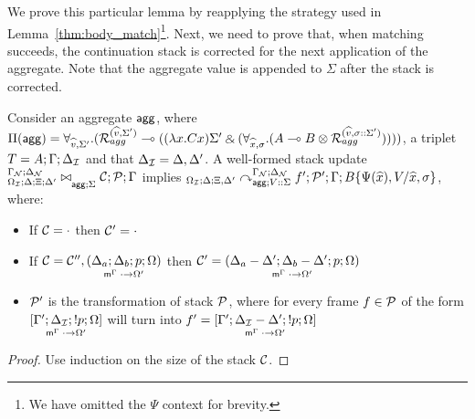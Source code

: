 We prove this particular lemma by reapplying the strategy used in
Lemma~\ref{thm:body_match}\footnote{We have omitted the $\Psi$ context for
brevity.}. Next, we need to prove that, when matching succeeds, the
continuation stack is corrected for the next application of the aggregate.  Note
that the aggregate value is appended to $\Sigma$ after the stack is corrected.

\begin{theorem}\label{thm:agg_from_update_to_derivation}
Consider an aggregate $\m{agg}$, where $\Pi(\m{agg}) = \forall_{\widehat{v}, \Sigma'}.
   (\defstwo{agg}{\widehat{v}}{\Sigma'} \lolli ((\lambda x. C x)\Sigma' \with (\forall_{\widehat{x}, \sigma}.
                                                (A \lolli B \otimes
                                                 \defstwo{agg}{\widehat{v}}{\sigma
                                                 ::\Sigma'}))))$,
a triplet $T = A; \Gamma; \deltan$ and that $\deltan = \Delta,
  \Delta'$.
A well-formed stack update
$\fixstatea{\Delta}{\Xi; \Delta'}{\lstack{C}; \lstack{P}}{\Gamma}{\Sigma}$
implies
$\derstatea{\Delta}{\Xi, \Delta'}{\gammanew}{\deltanew}{V :: \Sigma}{f';
   \lstack{P'}}{B\{\Psi(\widehat{x}), V / \widehat{x}, \sigma\}}$,
where:

\begin{itemize}[leftmargin=*]
   \item If $\lstack{C} = \cdot$ then $\lstack{C'} = \cdot$

   \item If $\lstack{C} = \lstack{C''},
   \lframe{\Delta_a}{\Delta_b}{p}{\Omega}{\cdot}{\Omega'}$
   then $\lstack{C'} = \lframe{\Delta_a - \Delta'}{\Delta_b -
      \Delta'}{p}{\Omega}{\cdot}{\Omega'}$

   \item $\lstack{P'}$ is the transformation of stack $\lstack{P}$, where for every frame $f \in
   \lstack{P}$ of the form $\pframe{\Gamma'}{\deltan}{\bang
      p}{\Omega}{\cdot}{\Omega'}$
   will turn into $f' = \pframe{\Gamma'}{\deltan-\Delta'}{\bang
      p}{\Omega}{\cdot}{\Omega'}$

\end{itemize}
\end{theorem}
\begin{proof}
Use induction on the size of the stack $\lstack{C}$.
\end{proof}


